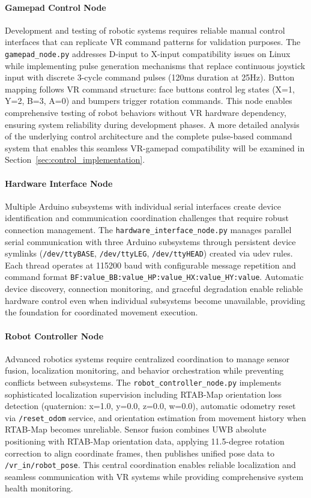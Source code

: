 \paragraph{Gamepad Control Node}

Development and testing of robotic systems requires reliable manual control interfaces that can replicate VR command patterns for validation purposes. The \texttt{gamepad\_node.py} addresses D-input to X-input compatibility issues on Linux while implementing pulse generation mechanisms that replace continuous joystick input with discrete 3-cycle command pulses (120ms duration at 25Hz). Button mapping follows VR command structure: face buttons control leg states (X=1, Y=2, B=3, A=0) and bumpers trigger rotation commands. This node enables comprehensive testing of robot behaviors without VR hardware dependency, ensuring system reliability during development phases. A more detailed analysis of the underlying control architecture and the complete pulse-based command system that enables this seamless VR-gamepad compatibility will be examined in Section~\ref{sec:control_implementation}.

\paragraph{Hardware Interface Node}

Multiple Arduino subsystems with individual serial interfaces create device identification and communication coordination challenges that require robust connection management. The \texttt{hardware\_interface\_node.py} manages parallel serial communication with three Arduino subsystems through persistent device symlinks (\texttt{/dev/ttyBASE}, \texttt{/dev/ttyLEG}, \texttt{/dev/ttyHEAD}) created via udev rules. Each thread operates at 115200 baud with configurable message repetition and command format \texttt{BF:value\_BB:value\_HP:value\_HX:value\_HY:value}. Automatic device discovery, connection monitoring, and graceful degradation enable reliable hardware control even when individual subsystems become unavailable, providing the foundation for coordinated movement execution.

\paragraph{Robot Controller Node}

Advanced robotics systems require centralized coordination to manage sensor fusion, localization monitoring, and behavior orchestration while preventing conflicts between subsystems. The \texttt{robot\_controller\_node.py} implements sophisticated localization supervision including RTAB-Map orientation loss detection (quaternion: x=1.0, y=0.0, z=0.0, w=0.0), automatic odometry reset via \texttt{/reset\_odom} service, and orientation estimation from movement history when RTAB-Map becomes unreliable. Sensor fusion combines UWB absolute positioning with RTAB-Map orientation data, applying 11.5-degree rotation correction to align coordinate frames, then publishes unified pose data to \texttt{/vr\_in/robot\_pose}. This central coordination enables reliable localization and seamless communication with VR systems while providing comprehensive system health monitoring.

